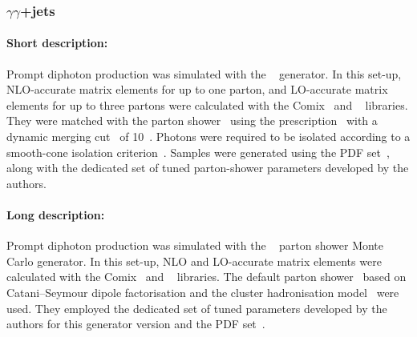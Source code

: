 


\subsubsection[yy+jets]{ $\gamma\gamma$+jets}

\paragraph{Short description:}

Prompt diphoton production was simulated with the
\SHERPA[2.2]~\cite{Bothmann:2019yzt} generator. In this set-up, NLO-accurate
matrix elements for up to one parton, and LO-accurate matrix elements for up
to three partons were calculated with the Comix~\cite{Gleisberg:2008fv} and
\OPENLOOPS~\cite{Buccioni:2019sur,Cascioli:2011va,Denner:2016kdg} libraries. They were matched
with the \SHERPA parton shower~\cite{Schumann:2007mg} using the \MEPSatNLO
prescription~\cite{Hoeche:2011fd,Hoeche:2012yf,Catani:2001cc,Hoeche:2009rj}
with a dynamic merging cut~\cite{Siegert:2016bre} of 10~\GeV.
Photons were required to be isolated according to a smooth-cone isolation
criterion~\cite{Frixione:1998jh}. Samples were generated using the
\NNPDF[3.0nnlo] PDF set~\cite{Ball:2014uwa}, along with the dedicated set of tuned
parton-shower parameters developed by the \SHERPA authors.



\paragraph{Long description:}

Prompt diphoton production was simulated with the
\SHERPA[2.2]~\cite{Bothmann:2019yzt} parton shower Monte Carlo
generator. In this set-up, NLO and LO-accurate
matrix elements were calculated with the Comix~\cite{Gleisberg:2008fv} and
\OPENLOOPS~\cite{Buccioni:2019sur,Cascioli:2011va,Denner:2016kdg} libraries.
The default \SHERPA parton shower~\cite{Schumann:2007mg} based on
Catani--Seymour dipole factorisation and the cluster hadronisation model~\cite{Winter:2003tt}
were used. They employed the dedicated set of tuned parameters developed by the
\SHERPA authors for this generator version and the \NNPDF[3.0nnlo]
PDF set~\cite{Ball:2014uwa}.

